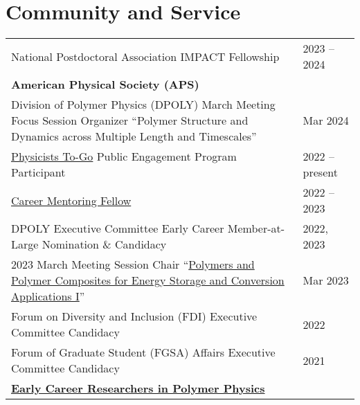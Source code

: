 \documentclass[letterpaper,11pt]{article}
\begin{document}
\section*{Community and Service}
\begin{tabular}{@{}p{}l@{}}
  National Postdoctoral Association IMPACT Fellowship & 2023 -- 2024\\[8pt]
  \multicolumn{2}{l}{\hspace{-3mm} \bf{American Physical Society (APS)}} \\
  \hspace{3mm} Division of Polymer Physics (DPOLY) March Meeting Focus Session Organizer ``Polymer Structure and Dynamics across Multiple Length and Timescales''  & Mar 2024 \\
  \hspace{3mm} \href{https://www.aps.org/programs/outreach/physiciststogo.cfm}{Physicists To-Go} Public Engagement Program Participant                                                                        & 2022 -- present \\
  \hspace{3mm} \href{https://www.aps.org/careers/guidance/mentoring.cfm}{Career Mentoring Fellow}                                                                                                       & 2022 -- 2023 \\
  \hspace{3mm} DPOLY Executive Committee Early Career Member-at-Large Nomination \& Candidacy                                    & 2022, 2023 \\   
  \hspace{3mm} 2023 March Meeting Session Chair ``\href{https://meetings.aps.org/Meeting/MAR23/Session/Y15}{Polymers and Polymer Composites for Energy Storage and Conversion Applications I}''         & Mar 2023 \\
  \hspace{3mm} Forum on Diversity and Inclusion (FDI) Executive Committee Candidacy                                                                    & 2022 \\
  \hspace{3mm} Forum of Graduate Student (FGSA) Affairs Executive Committee Candidacy                                                                   & 2021 \\[4pt]
  \multicolumn{2}{l}{\hspace{-3mm} \bf{\href{https://sites.google.com/view/polymerphysics/}{Early Career Researchers in Polymer Physics}}} \\

\end{tabular}
\end{document}

